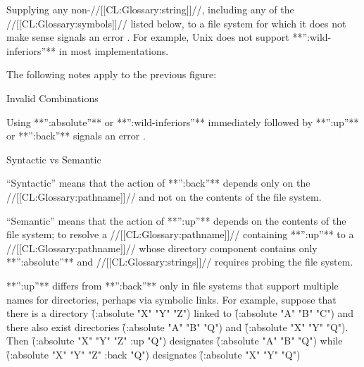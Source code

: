 Supplying any non-//[[CL:Glossary:string]]//, including any of the //[[CL:Glossary:symbols]]// listed below, 
to a file system for which it does not make sense
signals an error .
For example, Unix does not support **'':wild-inferiors''** in most implementations.
 
%

The following notes apply to the previous figure:

\beginlist
\item{Invalid Combinations}

Using **'':absolute''** or **'':wild-inferiors''** 
immediately followed by **'':up''** or **'':back''**
signals an error .
 
\item{Syntactic vs Semantic}

``Syntactic'' means that the action of **'':back''** 
depends only on the //[[CL:Glossary:pathname]]//
and not on the contents of the file system.  

``Semantic'' means that the action of **'':up''** 
depends on the contents of the file system; 
to resolve a //[[CL:Glossary:pathname]]// containing 
**'':up''** to a //[[CL:Glossary:pathname]]// whose directory component
contains only **'':absolute''** and 
//[[CL:Glossary:strings]]// requires probing the file system.

**'':up''** differs from 
**'':back''** only in file systems that support multiple
  names for directories, perhaps via symbolic links.  For example,
  suppose that there is a directory
\f{(:absolute "X" "Y" "Z")}
  linked to 
\f{(:absolute "A" "B" "C")}
  and there also exist directories
\f{(:absolute "A" "B" "Q")} and 
\f{(:absolute "X" "Y" "Q")}.
Then
\f{(:absolute "X" "Y" "Z" :up "Q")}
  designates
\f{(:absolute "A" "B" "Q")}
  while
\f{(:absolute "X" "Y" "Z" :back "Q")}
  designates
\f{(:absolute "X" "Y" "Q")}
\endlist 




